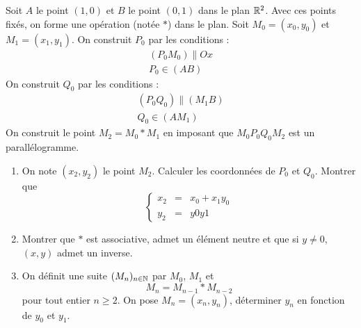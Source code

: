 Soit $A$ le point $(1,0)$ et $B$ le point $(0,1)$ dans le plan $\mathbb{R}^2$. Avec ces points fixés, on forme une opération (notée $*$) dans le plan.\newline
Soit $M_0=(x_0,y_0)$ et $M_1=(x_1,y_1)$. \newline
On construit $P_0$ par les conditions :
\begin{eqnarray*}
(P_0M_0)\parallel Ox \\
P_0 \in (AB)
\end{eqnarray*}
On construit $Q_0$ par les conditions :
\begin{eqnarray*}
(P_0 Q_0) \parallel (M_1B)\\
Q_0 \in (AM_1)
\end{eqnarray*}
On construit le point $M_2=M_0*M_1$ en imposant que $M_0P_0Q_0M_2$ est un parallélogramme.
\begin{enumerate}
\item On note $(x_2,y_2)$ le point $M_2$. Calculer les coordonnées de $P_0$ et $Q_0$. Montrer que
\[\left\lbrace  
\begin{array}{lcl}
x_2 & = & x_0+x_1y_0 \\ 
y_2 & = & y0 y1 
\end{array}
\right. \]
\item Montrer que $*$ est associative, admet un élément neutre et que si $y\neq0$, $(x,y)$ admet un inverse.
\item On définit une suite $(M_n)_{n\in\mathbb{N}}$ par $M_0$, $M_1$ et 
\[M_n=M_{n-1}*M_{n-2}\]
pour tout entier $n\geq 2$. On pose $M_n=(x_n,y_n)$, déterminer $y_n$ en fonction de $y_0$ et $y_1$.
\end{enumerate}

